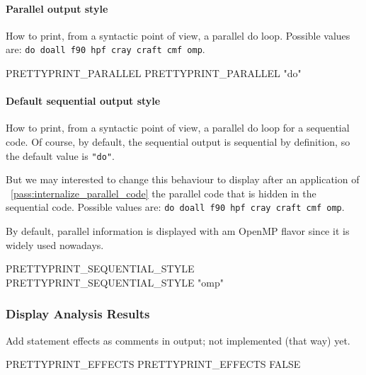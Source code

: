 \documentclass[a4paper]{report}
\newcommand{\PipsPassRef}[1]{\texttt{\detokenize{#1}}~\ref{pass:#1}}
\begin{document}
\paragraph{Parallel output style}
\label{sec:parall-outp-style}

How to print, from a syntactic point of view, a parallel do loop. Possible
values are: \texttt{do doall f90 hpf cray craft cmf omp}.

\begin{PipsProp}{PRETTYPRINT_PARALLEL}
PRETTYPRINT_PARALLEL "do"
\end{PipsProp}


\paragraph{Default sequential output style}
\label{sec:sequ-outp-style}

How to print, from a syntactic point of view, a parallel do loop for a
sequential code. Of course, by default, the sequential output is
sequential by definition, so the default value is \verb/"do"/.

But we may interested to change this behaviour to display after an
application of \PipsPassRef{internalize_parallel_code} the parallel code that is
hidden in the sequential code. Possible values are: \texttt{do doall f90
  hpf cray craft cmf omp}.

By default, parallel information is displayed with am OpenMP flavor since
it is widely used nowadays.
\begin{PipsProp}{PRETTYPRINT_SEQUENTIAL_STYLE}
PRETTYPRINT_SEQUENTIAL_STYLE "omp"
\end{PipsProp}


\subsubsection{Display Analysis Results}

Add statement effects as comments in output; not implemented (that way) yet.

\begin{PipsProp}{PRETTYPRINT_EFFECTS}
PRETTYPRINT_EFFECTS FALSE
\end{PipsProp}
\end{document}
